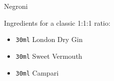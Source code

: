\documentclass{article}
\begin{document}
{\color[HTML]{A51C30} \Huge \sketchfont Negroni}

\medskip

\textsf{Ingredients for a classic 1:1:1 ratio:}

\begin{itemize}
    \item \texttt{30ml} London Dry Gin
    \item \texttt{30ml} Sweet Vermouth
    \item \texttt{30ml} Campari
\end{itemize}
\end{document}
